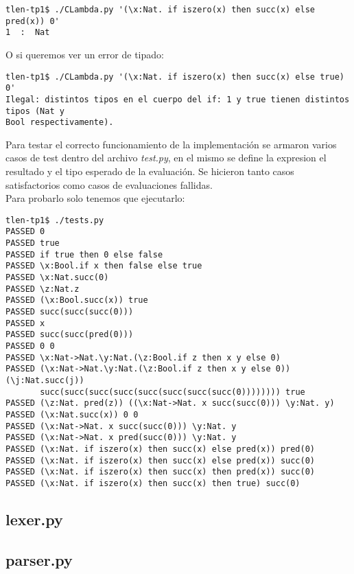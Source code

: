 \documentclass[spanish, a4paper]{article}
\begin{document}
\begin{verbatim}
tlen-tp1$ ./CLambda.py '(\x:Nat. if iszero(x) then succ(x) else pred(x)) 0'
1  :  Nat
\end{verbatim}

O si queremos ver un error de tipado:

\begin{verbatim}
tlen-tp1$ ./CLambda.py '(\x:Nat. if iszero(x) then succ(x) else true) 0'
Ilegal: distintos tipos en el cuerpo del if: 1 y true tienen distintos tipos (Nat y 
Bool respectivamente).
\end{verbatim}

Para testar el correcto funcionamiento de la implementación se armaron varios casos de test dentro del archivo \textit{test.py}, en el mismo se define la expresion el resultado y el tipo esperado de la evaluación. Se hicieron tanto casos satisfactorios como casos de evaluaciones fallidas.\\
Para probarlo solo tenemos que ejecutarlo:


\begin{verbatim}
tlen-tp1$ ./tests.py 
PASSED 0
PASSED true
PASSED if true then 0 else false
PASSED \x:Bool.if x then false else true
PASSED \x:Nat.succ(0)
PASSED \z:Nat.z
PASSED (\x:Bool.succ(x)) true
PASSED succ(succ(succ(0)))
PASSED x
PASSED succ(succ(pred(0)))
PASSED 0 0
PASSED \x:Nat->Nat.\y:Nat.(\z:Bool.if z then x y else 0)
PASSED (\x:Nat->Nat.\y:Nat.(\z:Bool.if z then x y else 0)) (\j:Nat.succ(j))
       succ(succ(succ(succ(succ(succ(succ(succ(0)))))))) true
PASSED (\z:Nat. pred(z)) ((\x:Nat->Nat. x succ(succ(0))) \y:Nat. y)
PASSED (\x:Nat.succ(x)) 0 0
PASSED (\x:Nat->Nat. x succ(succ(0))) \y:Nat. y
PASSED (\x:Nat->Nat. x pred(succ(0))) \y:Nat. y
PASSED (\x:Nat. if iszero(x) then succ(x) else pred(x)) pred(0)
PASSED (\x:Nat. if iszero(x) then succ(x) else pred(x)) succ(0)
PASSED (\x:Nat. if iszero(x) then succ(x) then pred(x)) succ(0)
PASSED (\x:Nat. if iszero(x) then succ(x) then true) succ(0)
\end{verbatim}

\newpage
\subsection{lexer.py}
      
\newpage
\subsection{parser.py}
      
\newpage
\end{document}
